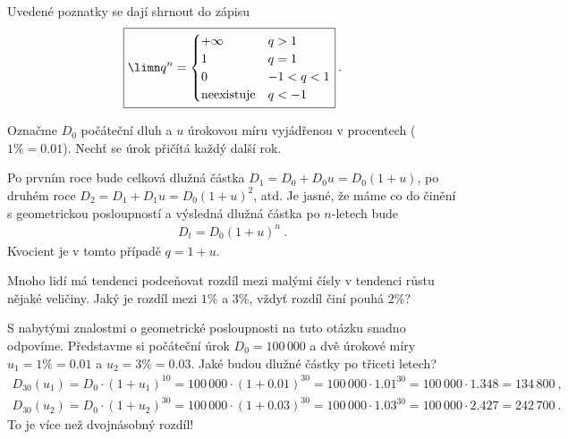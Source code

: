 Uvedené poznatky se dají shrnout do zápisu
\begin{align}
    \boxed{\limn q^n = \begin{cases}
        + \infty & q > 1 \\
        1 & q=1 \\
        0 & -1<q<1 \\
        \mathrm{neexistuje} & q<-1 
    \end{cases} }\:. 
\end{align}

\begin{example}
    Označme $D_0$ počáteční dluh a $u$ úrokovou míru vyjádřenou v procentech ($1 \% = 0.01$). Nechť se úrok přičítá každý další rok.
    
    Po prvním roce bude celková dlužná částka $D_1 = D_0 + D_0 u = D_0 (1 + u)$, po druhém roce $D_2 = D_1 + D_1 u = D_0 (1+u)^2$, atd. Je jasné, že máme co do činění s geometrickou posloupností a výsledná dlužná částka po $n$-letech bude 
    \begin{align}
        D_t = D_0 (1+u)^n \:.
    \end{align}
    Kvocient je v tomto případě $q = 1 + u$.
\end{example}

\begin{example}
    Mnoho lidí má tendenci podceňovat rozdíl mezi malými čísly v tendenci růstu nějaké veličiny. Jaký je rozdíl mezi $1 \%$ a $3 \%$, vždyť rozdíl činí pouhá $2 \%$? 

    S nabytými znalostmi o geometrické posloupnosti na tuto otázku snadno odpovíme. Představme si počáteční úrok $D_0 = 100\,000$ a dvě úrokové míry $u_1 = 1 \% = 0.01$ a $u_2 = 3 \% = 0.03$. Jaké budou dlužné částky po třiceti letech?
    \begin{align}
        D_{30}(u_1) = D_0 \cdot (1+u_1)^{10} =  100\,000 \cdot (1+0.01)^{30} = 100\,000 \cdot 1.01^{30} = 100\,000 \cdot 1.348 = 134\,800 \:, \\
        D_{30}(u_2) = D_0 \cdot (1+u_2)^{30} =  100\,000 \cdot (1+0.03)^{30} = 100\,000 \cdot 1.03^{30} = 100\,000 \cdot 2.427 = 242\,700 \:.
    \end{align}
    To je více než dvojnásobný rozdíl!
\end{example}


